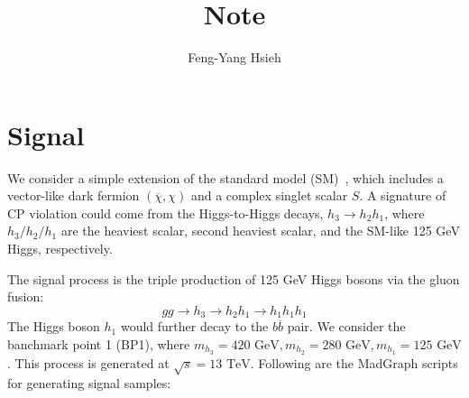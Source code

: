 \documentclass[12pt]{article}
\title{Note}
\author{Feng-Yang Hsieh}
\date{}
\begin{document}
\maketitle


\section{Signal}%
\label{sec:signal}
    We consider a simple extension of the standard model (SM)~\cite{Chen:2022vac}, which includes a vector-like dark fermion $(\overline{\chi}, \chi)$ and a complex singlet scalar $S$. A signature of CP violation could come from the Higgs-to-Higgs decays, $h_3 \to h_2h_1$, where $h_3 / h_2 / h_1$ are the heaviest scalar, second heaviest scalar, and the SM-like 125 GeV Higgs, respectively.

    The signal process is the triple production of 125 GeV Higgs bosons via the gluon fusion:
    \[
        g g \to h_3 \to h_2 h_1 \to h_1h_1h_1
    \]
    The Higgs boson $h_1$ would further decay to the $b \overline{b}$ pair. We consider the banchmark point 1 (BP1), where $m_{h_3} = \text{420 GeV}, m_{h_2} = \text{280 GeV}, m_{h_1} = \text{125 GeV}$. This process is generated at $\sqrt{s} = \text{13 TeV}$. Following are the MadGraph scripts for generating signal samples:
\end{document}

